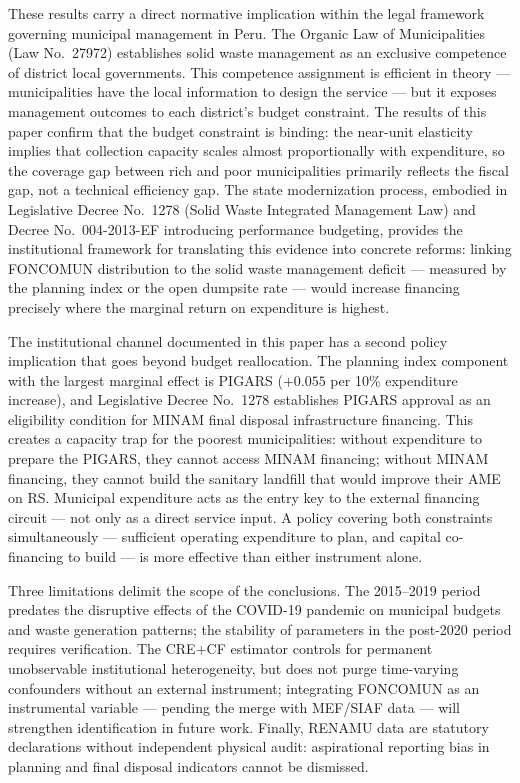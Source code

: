 These results carry a direct normative implication within the legal framework governing municipal management in Peru. The Organic Law of Municipalities (Law No.\ 27972) establishes solid waste management as an exclusive competence of district local governments. This competence assignment is efficient in theory --- municipalities have the local information to design the service --- but it exposes management outcomes to each district's budget constraint. The results of this paper confirm that the budget constraint is binding: the near-unit elasticity implies that collection capacity scales almost proportionally with expenditure, so the coverage gap between rich and poor municipalities primarily reflects the fiscal gap, not a technical efficiency gap. The state modernization process, embodied in Legislative Decree No.\ 1278 (Solid Waste Integrated Management Law) and Decree No.\ 004-2013-EF introducing performance budgeting, provides the institutional framework for translating this evidence into concrete reforms: linking FONCOMUN distribution to the solid waste management deficit --- measured by the planning index or the open dumpsite rate --- would increase financing precisely where the marginal return on expenditure is highest.

The institutional channel documented in this paper has a second policy implication that goes beyond budget reallocation. The planning index component with the largest marginal effect is PIGARS ($+0.055$ per 10\% expenditure increase), and Legislative Decree No.\ 1278 establishes PIGARS approval as an eligibility condition for MINAM final disposal infrastructure financing. This creates a capacity trap for the poorest municipalities: without expenditure to prepare the PIGARS, they cannot access MINAM financing; without MINAM financing, they cannot build the sanitary landfill that would improve their AME on RS. Municipal expenditure acts as the entry key to the external financing circuit --- not only as a direct service input. A policy covering both constraints simultaneously --- sufficient operating expenditure to plan, and capital co-financing to build --- is more effective than either instrument alone.

Three limitations delimit the scope of the conclusions. The 2015--2019 period predates the disruptive effects of the COVID-19 pandemic on municipal budgets and waste generation patterns; the stability of parameters in the post-2020 period requires verification. The CRE+CF estimator controls for permanent unobservable institutional heterogeneity, but does not purge time-varying confounders without an external instrument; integrating FONCOMUN as an instrumental variable --- pending the merge with MEF/SIAF data --- will strengthen identification in future work. Finally, RENAMU data are statutory declarations without independent physical audit: aspirational reporting bias in planning and final disposal indicators cannot be dismissed.

